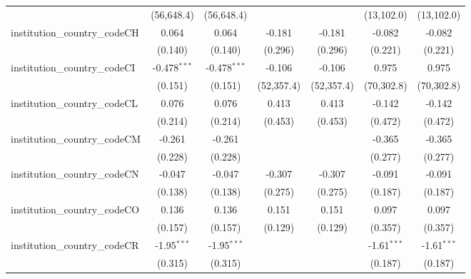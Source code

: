 \begin{tabular}{lcccccc}
                                         & (56,648.4)     & (56,648.4)     &                &                & (13,102.0)     & (13,102.0)\\   
   institution\_country\_codeCH          & 0.064          & 0.064          & -0.181         & -0.181         & -0.082         & -0.082\\   
                                         & (0.140)        & (0.140)        & (0.296)        & (0.296)        & (0.221)        & (0.221)\\   
   institution\_country\_codeCI          & -0.478$^{***}$ & -0.478$^{***}$ & -0.106         & -0.106         & 0.975          & 0.975\\   
                                         & (0.151)        & (0.151)        & (52,357.4)     & (52,357.4)     & (70,302.8)     & (70,302.8)\\   
   institution\_country\_codeCL          & 0.076          & 0.076          & 0.413          & 0.413          & -0.142         & -0.142\\   
                                         & (0.214)        & (0.214)        & (0.453)        & (0.453)        & (0.472)        & (0.472)\\   
   institution\_country\_codeCM          & -0.261         & -0.261         &                &                & -0.365         & -0.365\\   
                                         & (0.228)        & (0.228)        &                &                & (0.277)        & (0.277)\\   
   institution\_country\_codeCN          & -0.047         & -0.047         & -0.307         & -0.307         & -0.091         & -0.091\\   
                                         & (0.138)        & (0.138)        & (0.275)        & (0.275)        & (0.187)        & (0.187)\\   
   institution\_country\_codeCO          & 0.136          & 0.136          & 0.151          & 0.151          & 0.097          & 0.097\\   
                                         & (0.157)        & (0.157)        & (0.129)        & (0.129)        & (0.357)        & (0.357)\\   
   institution\_country\_codeCR          & -1.95$^{***}$  & -1.95$^{***}$  &                &                & -1.61$^{***}$  & -1.61$^{***}$\\   
                                         & (0.315)        & (0.315)        &                &                & (0.187)        & (0.187)\\   

\end{tabular}
